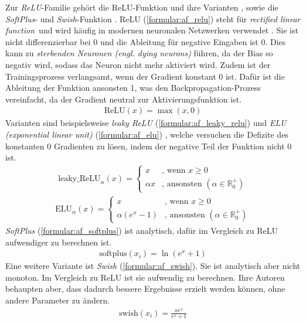 \newline
\newline
Zur \textit{ReLU}-Familie \cite{apicella2021survey} gehört die ReLU-Funktion \cite{glorot2011deep, konda2014zero, elfwing2018sigmoid, alcaide2018swish} und
ihre Varianten \cite{maas2013rectifier}, sowie die \textit{SoftPlus}- \cite{dugas2001incorporating} und \textit{Swish}-Funktion \cite{ramachandran2017searching}.
ReLU (\ref{formular:af_relu}) steht für \glqq\textit{rectified linear function}\grqq\ und wird häufig in modernen neuronalen Netzwerken verwendet \cite{apicella2021survey}.
Sie ist nicht differenzierbar bei 0 und die Ableitung für negative Eingaben ist 0.
Dies kann zu \textit{sterbenden Neuronen (engl. dying neurons)} führen, da der Bias so negativ wird, sodass das Neuron nicht mehr aktiviert wird.
Zudem ist der Trainingsprozess verlangsamt, wenn der Gradient konstant 0 ist.
Dafür ist die Ableitung der Funktion ansonsten 1, was den Backpropagation-Prozess vereinfacht, da der Gradient neutral zur Aktivierungsfunktion ist.
\begin{align}
    \label{formular:af_relu}
    \text{ReLU}(x) = \max(x, 0)
\end{align}
Varianten sind beispielsweise \textit{leaky ReLU} \cite{maas2013rectifier} (\ref{formular:af_leaky_relu}) und \textit{ELU (exponential linear unit)} (\ref{formular:af_elu})
\cite{clevert2015fast}, welche versuchen die Defizite des konstanten 0 Gradienten zu lösen, indem der negative Teil der Funktion nicht 0 ist.
\begin{align}
    \label{formular:af_leaky_relu}
    \text{leaky\_ReLU}_{\alpha}(x) = \begin{cases}
                               x & \text{, wenn } x \geq 0\\
                               \alpha x & \text{, ansonsten } (\alpha\in \mathbb{R}_{0}^{+})
    \end{cases}
\end{align}
\begin{align}
    \label{formular:af_elu}
    \text{ELU}_{\alpha}(x) = \begin{cases}
                                 x & \text{, wenn } x \geq 0\\
                                 \alpha(e^{x} - 1) & \text{, ansonsten } (\alpha\in \mathbb{R}_{0}^{+})
    \end{cases}
\end{align}
\textit{SoftPlus} (\ref{formular:af_softplus}) ist analytisch, dafür im Vergleich zu ReLU aufwendiger zu berechnen ist\cite{apicella2021survey}.
\begin{align}
    \label{formular:af_softplus}
    \text{softplus}(x_i) = \ln(e^x + 1)
\end{align}
Eine weitere Variante ist \textit{Swish} \cite{ramachandran2017searching} (\ref{formular:af_swish}).
Sie ist analytisch aber nicht monoton.
Im Vergleich zu ReLU ist sie aufwendig zu berechnen.
Ihre Autoren behaupten aber, dass dadurch bessere Ergebnisse erzielt werden können, ohne andere Parameter zu ändern.
\begin{align}
    \label{formular:af_swish}
    \text{swish}(x_i) = \frac{xe^x}{e^x + 1}
\end{align}